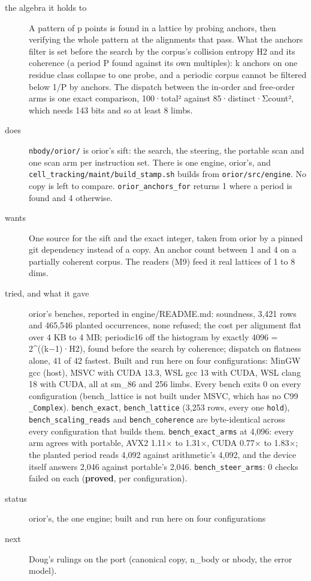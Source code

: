 \begin{description}
\item[{the algebra it holds to}] A pattern of p points is found in a lattice by probing anchors, then verifying the whole pattern at the alignments that pass. What the anchors filter is set before the search by the corpus's collision entropy H2 and its coherence (a period P found against its own multiples): k anchors on one residue class collapse to one probe, and a periodic corpus cannot be filtered below 1/P by anchors. The dispatch between the in-order and free-order arms is one exact comparison, 100·total² against 85·distinct·Σcount², which needs 143 bits and so at least 8 limbs.
\item[{does}] \texttt{nbody/\allowbreak{}orior/\allowbreak{}} is orior's sift: the search, the steering, the portable scan and one scan arm per instruction set. There is one engine, orior's, and \texttt{cell\_\allowbreak{}tracking/\allowbreak{}maint/\allowbreak{}build\_\allowbreak{}stamp.\allowbreak{}sh} builds from \texttt{orior/\allowbreak{}src/\allowbreak{}engine}. No copy is left to compare. \texttt{orior\_\allowbreak{}anchors\_\allowbreak{}for} returns 1 where a period is found and 4 otherwise.
\item[{wants}] One source for the sift and the exact integer, taken from orior by a pinned git dependency instead of a copy. An anchor count between 1 and 4 on a partially coherent corpus. The readers (M9) feed it real lattices of 1 to 8 dims.
\item[{tried, and what it gave}] orior's benches, reported in engine/README.md: soundness, 3,421 rows and 465,546 planted occurrences, none refused; the cost per alignment flat over 4 KB to 4 MB; periodic16 off the histogram by exactly 4096 = 2\textasciicircum{}((k−1)·H2), found before the search by coherence; dispatch on flatness alone, 41 of 42 fastest. Built and run here on four configurations: MinGW gcc (host), MSVC with CUDA 13.3, WSL gcc 13 with CUDA, WSL clang 18 with CUDA, all at sm\_\allowbreak{}86 and 256 limbs. Every bench exits 0 on every configuration (bench\_\allowbreak{}lattice is not built under MSVC, which has no C99 \texttt{\_\allowbreak{}Complex}). \texttt{bench\_\allowbreak{}exact}, \texttt{bench\_\allowbreak{}lattice} (3,253 rows, every one \texttt{hold}), \texttt{bench\_\allowbreak{}scaling\_\allowbreak{}reads} and \texttt{bench\_\allowbreak{}coherence} are byte-identical across every configuration that builds them. \texttt{bench\_\allowbreak{}exact\_\allowbreak{}arms} at 4,096: every arm agrees with portable, AVX2 1.11× to 1.31×, CUDA 0.77× to 1.83×; the planted period reads 4,092 against arithmetic's 4,092, and the device itself answers 2,046 against portable's 2,046. \texttt{bench\_\allowbreak{}steer\_\allowbreak{}arms}: 0 checks failed on each (\textbf{proved}, per configuration).
\item[{status}] orior's, the one engine; built and run here on four configurations
\item[{next}] Doug's rulings on the port (canonical copy, n\_\allowbreak{}body or nbody, the error model).
\end{description}

